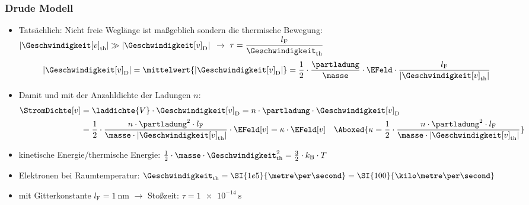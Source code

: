 \begin{frame}
  \frametitle{Drude Modell}
\begin{itemize}[<+->]      
\item Tatsächlich: Nicht freie Weglänge ist maßgeblich sondern die \alert{thermische Bewegung}: \(|\Geschwindigkeit[v]_\mathrm{th}| \gg |\Geschwindigkeit[v]_\mathrm{D}| \) $\to$ $\tau  = \dfrac{l_\mathrm{F}}{\Geschwindigkeit_\mathrm{th}}$ 
$$
	|\Geschwindigkeit[v]_\mathrm{D}| = \mittelwert{|\Geschwindigkeit[v]_\mathrm{D}|} = \dfrac{1}{2} \cdot \dfrac{\partladung}{\masse} \cdot \EFeld \cdot \dfrac{l_\mathrm{F}}{|\Geschwindigkeit[v]_\mathrm{th}|}
$$
\item Damit und mit der Anzahldichte der Ladungen \(n\):
  \begin{align*}
	\StromDichte[v] &= \laddichte{V} \cdot \Geschwindigkeit[v]_\mathrm{D} = n \cdot \partladung \cdot \Geschwindigkeit[v]_\mathrm{D}\\
		&= \dfrac{1}{2} \cdot \dfrac{n \cdot \partladung^2 \cdot l_\mathrm{F}}{\masse \cdot |\Geschwindigkeit[v]_\mathrm{th}|} \cdot \EFeld[v] = \kappa \cdot \EFeld[v]\quad\Aboxed{\kappa= \dfrac{1}{2} \cdot \dfrac{n \cdot \partladung^2 \cdot l_\mathrm{F}}{\masse \cdot |\Geschwindigkeit[v]_\mathrm{th}|}}  
\end{align*}
\item kinetische Energie/thermische Energie:
$\frac{1}{2} \cdot \masse \cdot \Geschwindigkeit_\mathrm{th}^2 = \frac{3}{2} \cdot k_\mathrm{B} \cdot T$
\item Elektronen bei Raumtemperatur:
$\Geschwindigkeit_\mathrm{th} = \SI{1e5}{\metre\per\second} = \SI{100}{\kilo\metre\per\second}$
\item mit Gitterkonstante \(l_\mathrm{F} = \SI{1}{\nano\metre} \) $\to$ Stoßzeit:
$\tau = \SI{1e-14}{\second}$
  \end{itemize}
\end{frame}
 
